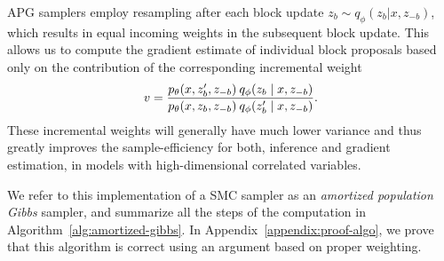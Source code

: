 \documentclass{article}
\theoremstyle{definition}
\begin{document}

APG samplers employ resampling after each block update $z_b \sim q_\phi(z_b | x, z_{-b})$, which results in equal incoming weights in the subsequent block update. This allows us to compute the gradient estimate of individual block proposals based only on the contribution of the corresponding incremental weight 
\begin{align*}
    v
    = 
    \frac{p_\theta(x, z'_b, z_{-b}) \: q_\phi(z_b \mid  x, z_{-b})}
         {p_\theta(x, z_b, z_{-b}) \: q_\phi(z'_b \mid  x, z_{-b})}
    .
\end{align*}
These incremental weights will generally have much lower variance and thus greatly improves the sample-efficiency for both, inference and gradient estimation, in models with high-dimensional correlated variables.

We refer to this implementation of a SMC sampler as an \emph{amortized population Gibbs} sampler, and summarize all the steps of the computation in Algorithm~\ref{alg:amortized-gibbs}. In Appendix~\ref{appendix:proof-algo}, we prove that this algorithm is correct using an argument based on proper weighting. 
\end{document}
